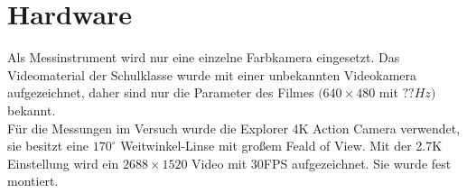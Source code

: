 \section{Hardware}
\label{hardware}
Als Messinstrument wird nur eine einzelne Farbkamera eingesetzt. Das Videomaterial der Schulklasse wurde mit einer unbekannten Videokamera aufgezeichnet, daher sind nur die Parameter des Filmes $(640 \times 480$ mit $??Hz)$ bekannt.\\
Für die Messungen im Versuch wurde die Explorer 4K Action Camera verwendet, sie besitzt eine $170^\circ$ Weitwinkel-Linse mit großem Feald of View. Mit der 2.7K Einstellung wird ein $2688 \times 1520$ Video mit 30FPS aufgezeichnet. Sie wurde fest montiert.